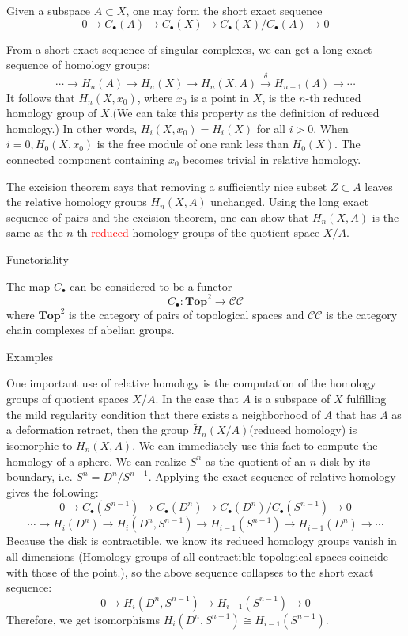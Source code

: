 \documentclass{ctexart}
\newcommand{\Top}{\mathbf{Top}}
\begin{document}
\begin{enumerate}
Given a subspace $A\subset X$, one may form the short exact sequence
\[
0\to C_{\bullet}(A)\to C_{\bullet}(X)\to C_{\bullet}(X)/C_{\bullet}(A) \to 0
\]

From a short exact sequence of singular complexes, we can get a long exact sequence of homology groups:
\[
\cdots \to H_n(A) \to H_n(X) \to H_n(X,A) \overset{\delta}{\to} H_{n-1}(A) \to \cdots
\]
It follows that $H_n(X, x_0)$, where $x_0$ is a point in $X$, is the $n$-th reduced homology group of $X$.(We can take this property as the definition of reduced homology.) In other words, $H_i(X, x_0) = H_i(X)$ for all $i > 0$. When $i = 0, H_0(X, x_0)$ is the free module of one rank less than $H_0(X)$. The connected component containing $x_0$ becomes trivial in relative homology.

The excision theorem says that removing a sufficiently nice subset $Z\subset A$ leaves the relative homology groups $H_n(X, A)$ unchanged. Using the long exact sequence of pairs and the excision theorem, one can show that $H_n(X, A)$ is the same as the $n$-th \textcolor{red}{reduced} homology groups of the quotient space $X/A$.\cite[p.50]{vick2012homology}

Functoriality

The map $C_{\bullet}$ can be considered to be a functor
\[
C_{\bullet} : \Top^2 \to \mathcal{CC}
\]
where $\Top^2$ is the category of pairs of topological spaces and $\mathcal{CC}$ is the category chain complexes of abelian groups.

\iffalse
Examples

One important use of relative homology is the computation of the homology groups of quotient spaces $X/A$. In the case that $A$ is a subspace of $X$ fulfilling the mild regularity condition that there exists a neighborhood of $A$ that has $A$ as a deformation retract, then the group $\tilde{H}_n(X/A)$(reduced homology) is isomorphic to $H_n(X,A)$. We can immediately use this fact to compute the homology of a sphere. We can realize $S^n$ as the quotient of an $n$-disk by its boundary, i.e. $S^n = D^n/S^{n-1}$. Applying the exact sequence of relative homology gives the following:
\[
0 \to C_{\bullet}(S^{n-1}) \to C_{\bullet}(D^n) \to C_{\bullet}(D^n)/C_{\bullet}(S^{n-1}) \to 0
\]
\[
\cdots\to H_i(D^n)\to H_i(D^n,S^{n-1})\to H_{i-1}(S^{n-1})\to H_{i-1}(D^n)\to\cdots
\]
Because the disk is contractible, we know its reduced homology groups vanish in all dimensions (Homology groups of all contractible topological spaces coincide with those of the point.), so the above sequence collapses to the short exact sequence:
\[
0\to H_i(D^n,S^{n-1})\to H_{i-1}(S^{n-1})\to 0
\]
Therefore, we get isomorphisms $H_i(D^n,S^{n-1}) \cong H_{i-1}(S^{n-1})$.


\end{enumerate}
\end{document}
